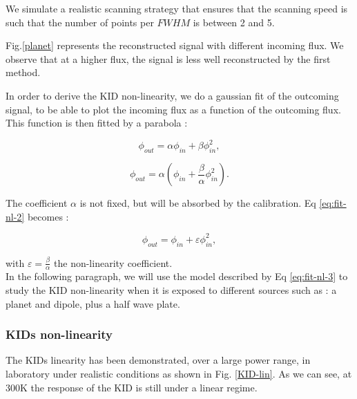 \newpage

We simulate a realistic scanning strategy that ensures that the scanning speed is such that the number of points per $FWHM$ is between 2 and 5.




Fig.\ref{planet} represents the reconstructed signal with different incoming flux. We observe that at a higher flux, the signal is less well reconstructed by the first method.



In order to derive the KID non-linearity, we do a gaussian fit of the outcoming signal, to be able to plot the incoming flux as a function of the outcoming flux. This function is then fitted by a parabola :

\begin{equation}
\phi_{out} = \alpha \phi_{in} + \beta \phi_{in}^{2} ,
\label{eq:fit-nl-1}
\end{equation}

\begin{equation}
\phi_{out} = \alpha (\phi_{in} + \frac{\beta}{\alpha}  \phi_{in}^{2}).
\label{eq:fit-nl-2}
\end{equation}

The coefficient $\alpha$ is not fixed, but will be absorbed by the calibration. Eq \ref{eq:fit-nl-2} becomes :

\begin{equation}
\phi_{out} = \phi_{in} + \varepsilon \phi_{in}^{2},
\label{eq:fit-nl-3}
\end{equation}

with $\varepsilon = \frac{\beta}{\alpha}$ the non-linearity coefficient. \\
In the following paragraph, we will use the model described by Eq \ref{eq:fit-nl-3} to study the KID non-linearity when it is exposed to different sources such as : a planet and dipole, plus a half wave plate.

\subsubsection{KIDs non-linearity}

The KIDs linearity has been demonstrated, over a large power range, in laboratory under realistic conditions as shown in Fig. \ref{KID-lin}. As we can see, at 300K the response of the KID is still under a linear regime.

